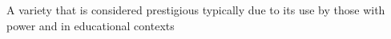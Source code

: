 A variety that is considered prestigious typically due to its use by those with power and in educational contexts

